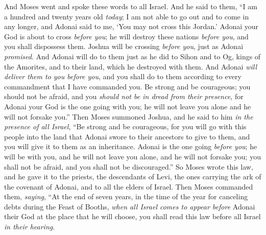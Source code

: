 \begin{biblechapter} %
 And Moses went and spoke these words to all Israel.
\verse And he said to them, “I am a hundred and twenty years old \textit{today}; I am not able to go out and to come in any longer, and Adonai said to me, ‘You may not cross this Jordan.’
\verse Adonai your God is about to cross \textit{before you}; he will destroy these nations \textit{before you}, and you shall dispossess them. Joshua will be crossing \textit{before you}, just as Adonai \textit{promised}.
\verse And Adonai will do to them just as he did to Sihon and to Og, kings of the Amorites, and to their land, which he destroyed with them.
\verse And Adonai \textit{will deliver them to you before you}, and you shall do to them according to every commandment that I have commanded you.
\verse Be strong and be courageous; you should not be afraid, and you \textit{should not be in dread from their presence}, for Adonai your God is the one going with you; he will not leave you alone and he will not forsake you.”
\verse Then Moses summoned Joshua, and he said to him \textit{in the presence of all Israel}, “Be strong and be courageous, for you will go with this people into the land that Adonai swore to their ancestors to give to them, and you will give it to them as an inheritance.
\verse Adonai is the one going \textit{before you}; he will be with you, and he will not leave you alone, and he will not forsake you; you shall not be afraid, and you shall not be discouraged.”
\verse So Moses wrote this law, and he gave it to the priests, the descendants of Levi, the ones carrying the ark of the covenant of Adonai, and to all the elders of Israel.
\verse Then Moses commanded them, \textit{saying}, “At the end of seven years, in the time of the year for canceling debts during the Feast of Booths,
\verse \textit{when all Israel comes to appear before} Adonai their God at the place that he will choose, you shall read this law before all Israel \textit{in their hearing}.

\end{biblechapter}
